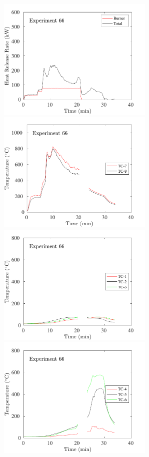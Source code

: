 \begin{figure}[H]
\includegraphics[height=2.30in]{../SCRIPT_FIGURES/Test_66_HRR} \hfill
\includegraphics[height=2.30in]{../SCRIPT_FIGURES/Test_66_TC_7-8} \\
\includegraphics[height=2.30in]{../SCRIPT_FIGURES/Test_66_TC_1-3} \hfill
\includegraphics[height=2.30in]{../SCRIPT_FIGURES/Test_66_TC_4-6}

\end{figure}
